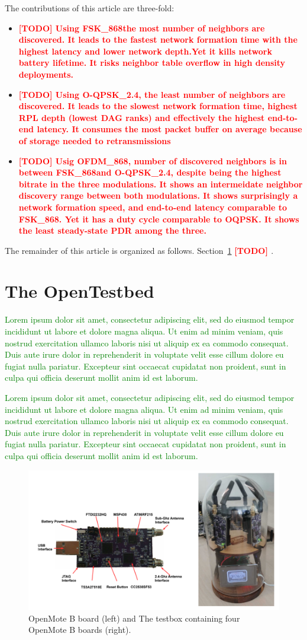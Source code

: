 \documentclass[journal]{IEEEtran}
\newcommand{\fsk}          {    FSK\_868}
\newcommand{\oqpsk}        {O-QPSK\_2.4}
\newcommand{\ofdm}         {OFDM\_868}
\newcommand{\todo}[1]      {\textbf{\textcolor{red}{[TODO] #1}}}
\newcommand{\lorem}        {\textcolor{green}{Lorem ipsum dolor sit amet, consectetur adipiscing elit, sed do eiusmod tempor incididunt ut labore et dolore magna aliqua. Ut enim ad minim veniam, quis nostrud exercitation ullamco laboris nisi ut aliquip ex ea commodo consequat. Duis aute irure dolor in reprehenderit in voluptate velit esse cillum dolore eu fugiat nulla pariatur. Excepteur sint occaecat cupidatat non proident, sunt in culpa qui officia deserunt mollit anim id est laborum.}}
\begin{document}
The contributions of this article are three-fold:

\begin{itemize}
   \item \todo{Using \fsk the most number of neighbors are discovered. It leads to the fastest network formation time with the highest latency and lower network depth.Yet it kills network battery lifetime. It risks neighbor table overflow in high density deployments.}
   \item \todo{Using \oqpsk, the least number of neighbors are discovered. It leads to the slowest network formation time, highest RPL depth (lowest DAG ranks) and effectively the highest end-to-end latency. It consumes the most packet buffer on average because of storage needed to retransmissions}
   \item \todo{Usig \ofdm, number of discovered neighbors is in between \fsk and \oqpsk, despite being the highest bitrate in the three modulations. It shows an intermeidate neighbor discovery range between both modulations. It shows surprisingly a network formation speed, and end-to-end latency comparable to \fsk. Yet it has a duty cycle comparable to OQPSK. It shows the least steady-state PDR among the three. }
\end{itemize}
  


The remainder of this article is organized as follows.
Section~\ref{sec:opentested} \todo{}.

\section{The OpenTestbed}
\label{sec:opentested}


\lorem


\lorem

\begin{figure}
	\centering
	\includegraphics[width=0.90\columnwidth]{mote_ot}
	\caption{OpenMote B board (left) and The testbox containing four OpenMote B boards (right).}
    \label{fig:testbox}
\end{figure}
\end{document}
